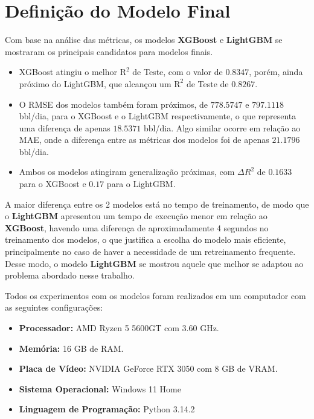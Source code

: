 \section{Definição do Modelo Final}
\label{sec:modelo_final}

Com base na análise das métricas, os modelos \textbf{XGBoost} e \textbf{LightGBM} se mostraram os principais candidatos para modelos finais.

\begin{itemize}
    \item XGBoost atingiu o melhor $\text{R}^2$ de Teste, com o valor de $\mathbf{0.8347}$, porém, ainda próximo do LightGBM, que alcançou um $\text{R}^2$ de Teste de $\mathbf{0.8267}$.
    \item O \gls{RMSE} dos modelos também foram próximos, de $\mathbf{778.5747}$ e $\mathbf{797.1118}$ bbl/dia, para o XGBoost e o LightGBM respectivamente, o que representa uma diferença de apenas $18.5371$ bbl/dia. Algo similar ocorre em relação ao \gls{MAE}, onde a diferença entre as métricas dos modelos foi de apenas $21.1796$ bbl/dia.
    \item Ambos os modelos atingiram generalização próximas, com $\Delta R^2$ de $\mathbf{0.1633}$ para o XGBoost e $\mathbf{0.17}$ para o LightGBM.
\end{itemize}

A maior diferença entre os 2 modelos está no tempo de treinamento, de modo que o \textbf{LightGBM} apresentou um tempo de execução menor em relação ao \textbf{XGBoost}, havendo uma diferença de aproximadamente 4 segundos no treinamento dos modelos, o que justifica a escolha do modelo mais eficiente, principalmente no caso de haver a necessidade de um retreinamento frequente. Desse modo, o modelo \textbf{LightGBM} se mostrou aquele que melhor se adaptou ao problema abordado nesse trabalho.

Todos os experimentos com os modelos foram realizados em um computador com as seguintes configurações:

\begin{itemize}
    \item \textbf{Processador:} AMD Ryzen 5 5600GT com 3.60 GHz.
    \item \textbf{Memória:} 16 GB de RAM.
    \item \textbf{Placa de Vídeo:} NVIDIA GeForce RTX 3050 com 8 GB de VRAM.
    \item \textbf{Sistema Operacional:} Windows 11 Home
    \item \textbf{Linguagem de Programação:} Python 3.14.2
\end{itemize}

